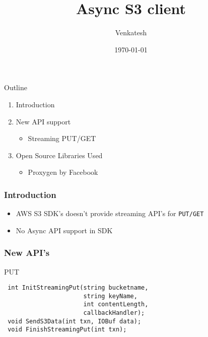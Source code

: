 \documentclass{beamer}
\title{Async S3 client} %
\author{Venkatesh} %
\institute{WDC}
\date{\today} %
\begin{document}
\lstset{
    basicstyle=\ttfamily\footnotesize,
    breaklines=true
    breakatwhitespace=true,
    language=C++,
    columns=fullflexible,
    keepspaces=true,
    breaklines=true,
    tabsize=3, 
    showstringspaces=false,
    extendedchars=true
    inputencoding=utf8
}

\begin{frame}
\titlepage %
\end{frame}

\begin{frame}{Outline}
  \begin{enumerate}
   \item Introduction
   \item New API support
        \begin{itemize}
        \item Streaming PUT/GET
        \end{itemize}
   \item Open Source Libraries Used
        \begin{itemize}
        \item Proxygen by Facebook
        \end{itemize}
  \end{enumerate}
\end{frame}



\begin{frame}[fragile]
\frametitle{Introduction}

\begin{itemize}

\item AWS S3 SDK's doesn't provide streaming API's for \texttt{PUT/GET}
\item No Async API support in SDK

\end{itemize}


\end{frame}


\begin{frame}[fragile]
\frametitle{New API's}

\begin{block} {PUT}
\begin{lstlisting}
 int InitStreamingPut(string bucketname,
                      string keyName,
                      int contentLength,
                      callbackHandler);
 void SendS3Data(int txn, IOBuf data);
 void FinishStreamingPut(int txn);
\end{lstlisting}
\end{block}
\end{frame}
\end{document}
